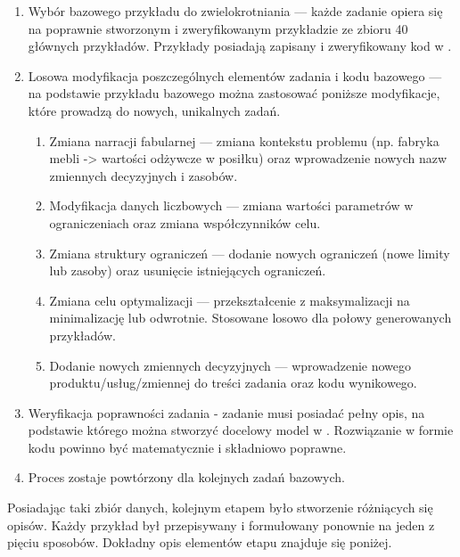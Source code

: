 \begin{enumerate}
\item Wybór bazowego przykładu do zwielokrotniania --- każde zadanie opiera się na poprawnie stworzonym i zweryfikowanym przykładzie ze zbioru 40 głównych przykładów. Przykłady posiadają zapisany i zweryfikowany kod w .
\item Losowa modyfikacja poszczególnych elementów zadania i kodu bazowego --- na podstawie przykładu bazowego można zastosować poniższe modyfikacje, które prowadzą do nowych, unikalnych zadań.
\begin{enumerate}
\item Zmiana narracji fabularnej --- zmiana kontekstu problemu (np. fabryka mebli -> wartości odżywcze w posiłku) oraz wprowadzenie nowych nazw zmiennych decyzyjnych i zasobów.
\item Modyfikacja danych liczbowych --- zmiana wartości parametrów w ograniczeniach oraz zmiana współczynników celu.
\item Zmiana struktury ograniczeń --- dodanie nowych ograniczeń (nowe limity lub zasoby) oraz usunięcie istniejących ograniczeń.
\item Zmiana celu optymalizacji --- przekształcenie z maksymalizacji na minimalizację lub odwrotnie. Stosowane losowo dla połowy generowanych przykładów.
\item Dodanie nowych zmiennych decyzyjnych --- wprowadzenie nowego produktu/usług/zmiennej do treści zadania oraz kodu wynikowego.
\end{enumerate}
\item Weryfikacja poprawności zadania - zadanie musi posiadać pełny opis, na podstawie którego można stworzyć docelowy model w . Rozwiązanie w formie kodu powinno być matematycznie i składniowo poprawne.
\item Proces zostaje powtórzony dla kolejnych zadań bazowych.
\end{enumerate}

Posiadając taki zbiór danych, kolejnym etapem było stworzenie różniących się opisów. Każdy przykład był przepisywany i formułowany ponownie na jeden z pięciu sposobów. Dokładny opis elementów etapu znajduje się poniżej.


